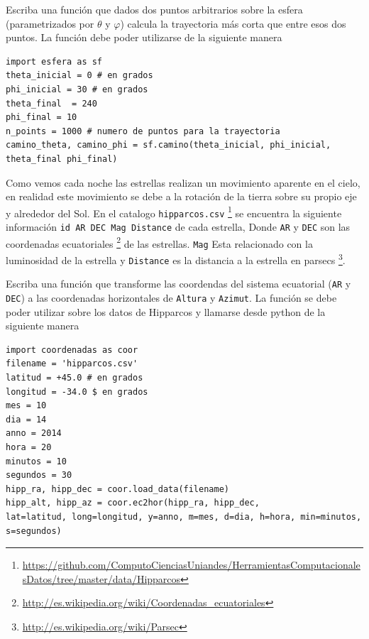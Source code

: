 \documentclass[11pt,letterpaper]{exam}
\begin{document}
\begin{questions}
Escriba una funci\'on que dados dos puntos arbitrarios sobre la
esfera (parametrizados por $\theta$ y $\varphi$) calcula la
trayectoria m\'as corta que entre esos dos puntos. La funci\'on debe
poder utilizarse de la siguiente manera 


\begin{verbatim}
import esfera as sf
theta_inicial = 0 # en grados
phi_inicial = 30 # en grados
theta_final  = 240
phi_final = 10 
n_points = 1000 # numero de puntos para la trayectoria
camino_theta, camino_phi = sf.camino(theta_inicial, phi_inicial,
theta_final phi_final)
\end{verbatim}

Como vemos cada noche las estrellas realizan un movimiento aparente en
el cielo, en realidad este movimiento se debe a la rotación de la
tierra sobre su propio eje y alrededor del Sol. En el catalogo
\verb+hipparcos.csv+ \footnote{\url{https://github.com/ComputoCienciasUniandes/HerramientasComputacionalesDatos/tree/master/data/Hipparcos}} 
se encuentra la siguiente información  \verb+id AR DEC Mag Distance+
de cada estrella, Donde  \verb+AR+ y \verb+DEC+ son las coordenadas
ecuatoriales \footnote{\url{http://es.wikipedia.org/wiki/Coordenadas_ecuatoriales}}
de las estrellas. \verb+Mag+ Esta relacionado con la luminosidad de la
estrella y \verb+Distance+ es la distancia a la estrella en
parsecs \footnote{\url{http://es.wikipedia.org/wiki/Parsec}}. 

Escriba una funci\'on que transforme las
coordendas del sistema ecuatorial (\verb+AR+ y \verb+DEC+) a las
coordenadas horizontales de \verb+Altura+ y \verb+Azimut+. La
funci\'on se debe poder utilizar sobre los datos de Hipparcos y
llamarse desde python de la siguiente manera 
\begin{verbatim}
import coordenadas as coor
filename = 'hipparcos.csv'
latitud = +45.0 # en grados
longitud = -34.0 $ en grados
mes = 10
dia = 14
anno = 2014
hora = 20
minutos = 10
segundos = 30
hipp_ra, hipp_dec = coor.load_data(filename)
hipp_alt, hipp_az = coor.ec2hor(hipp_ra, hipp_dec, 
lat=latitud, long=longitud, y=anno, m=mes, d=dia, h=hora, min=minutos,
s=segundos)  
\end{verbatim}



\end{questions}
\end{document}
